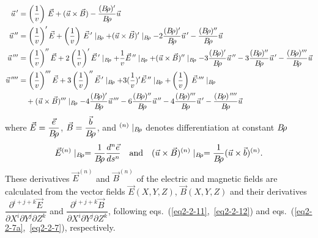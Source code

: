 \begin{equation}
	\begin{aligned}
		\vec  u^{\,\prime}    
		   & =  \left(\dfrac{1 }{ v}\right)\, \vec  E
		      + (\vec  u\times\vec  B) - 
		      \dfrac{(\Br )^\prime }{ \Br}  \vec  u \\
		\vec  u^{\,\prime\prime}  
		   &   =  \left(\dfrac{1 }{ v}\right)^\prime\vec  E 
		      + \left(\dfrac{1 }{ v}\right)\,\vec  E{^{\,\prime}} \mid_{ \Br} 
		      +(\vec u\times\vec  B)^\prime \mid_{ \Br}
		      -2 \dfrac{(\Br )^\prime }{ \Br} \vec  u^{\,\prime} 
		      - \dfrac{(\Br )^{\prime\prime} }{ \Br}  \vec  u \\
		\vec  u^{\,\prime\prime\prime} 
		   &  =   \left(\dfrac{1 }{v}\right)^{\prime\prime}\vec  E
		      +2 \left(\dfrac{1 }{ v}\right)^\prime\vec  E^{\,\prime} \mid_{ \Br}
		      +\dfrac{1 }{ v} \vec  E^{\,\prime\prime} \mid_{ \Br} 
		      +(\vec  u\times\vec B)^{\prime\prime} \mid_{ \Br}  
		      -3 \dfrac{(\Br )^\prime }{ \Br}  \vec u^{\,\prime\prime} 
		      -3 \dfrac{(\Br )^{\prime\prime} }{ \Br}  \vec  u^{\,\prime}
		      - \dfrac{(\Br )^{\prime\prime\prime} }{ \Br}  \vec  u \\
		\vec  u^{\quaprime}  
		   & =    \left(\dfrac{1}{ v}\right)^{\prime\prime\prime}  \vec  E
		      +3 \left(\dfrac{1 }{ v}\right)^{\prime\prime}\vec E^{\,\prime} \mid_{ \Br} 
		      +3( \dfrac{1 }{ v})^\prime\vec  E^{\,\prime\prime} \mid_{\Br} 
		      +\left(\dfrac{1 }{ v}\right)\, \vec  E^{\,\prime\prime\prime} \mid_{ \Br} \\
		  &  \quad + (\vec  u\times\vec B)^{\prime\prime\prime} \mid_{ \Br} 
		      -4 \dfrac{(\Br )^\prime }{ \Br}  \vec u^{\,\prime\prime\prime} 
		      -6 \dfrac{(\Br )^{\prime\prime} }{ \Br}  \vec u^{\,\prime\prime} 
		      -4 \dfrac{(\Br )^{\prime\prime\prime} }{ \Br}  \vec  u^{\,\prime} 
		      - \dfrac{(\Br )^{\quaprime} }{ \Br}  \vec  u
	\end{aligned}
	\label{eq2-2-19}
\end{equation}
%
where $ \vec  E =  \dfrac{\vec  e }{ B\!\rho} $, 
$ \vec  B =\dfrac{\vec  b }{ B\!\rho} $, and $^{(n)}\mid_{ B\!\rho} $ denotes differentiation at constant $ B\!\rho$ 
 \begin{equation}
	 \vec  E^{(n)}\mid_{ B\!\rho} = \dfrac{1 }{ B\!\rho}  \dfrac{d^n\vec  e }{ ds^n}
	 \quad \text{and} \quad 
	 (\vec  u\times\vec  B)^{(n)}\mid_{ B\!\rho} = \dfrac{1}{B\!\rho}  (\vec  u\times\vec  b)^{(n)}.
 	\label{eq2-2-20}
 \end{equation}
\noindent These derivatives $ \vec  E^{(n)} $ and $ \vec  B^{(n)} $ of the
electric and magnetic fields are 
calculated from the vector fields $ \vec  E(X,Y,Z)$,  $ \vec  B(X,Y,Z) $ and
their derivatives  
$ \dfrac{ \partial^{i+j+k} \vec  E }{ \partial X^i \partial Y^j\partial Z^k} $ 
and 
$ \dfrac{ \partial^{ i+j+k} \vec  B }{ \partial X^i \partial Y^j \partial Z^k}$, 
following eqs.~(\ref{eq2-2-11},~\ref{eq2-2-12}) and eqs.~(\ref{eq2-2-7a},~\ref{eq2-2-7}), respectively.


